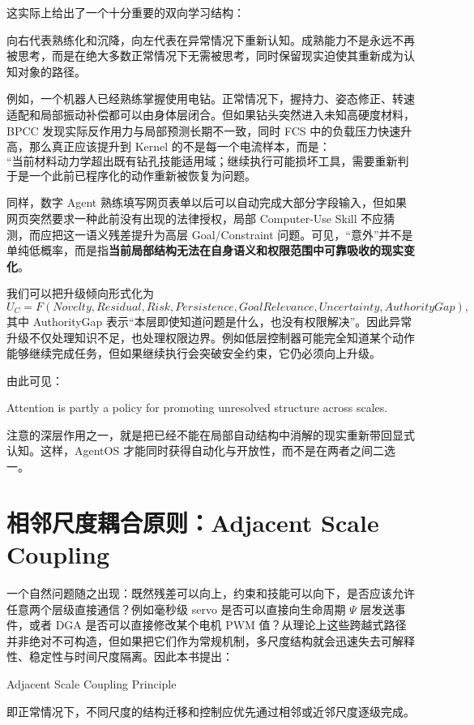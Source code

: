 这实际上给出了一个十分重要的双向学习结构：
\begin{statementbox}
\centering
{}
\end{statementbox}
向右代表熟练化和沉降，向左代表在异常情况下重新认知。成熟能力不是永远不再被思考，而是在绝大多数正常情况下无需被思考，同时保留现实迫使其重新成为认知对象的路径。

例如，一个机器人已经熟练掌握使用电钻。正常情况下，握持力、姿态修正、转速适配和局部振动补偿都可以由身体层闭合。但如果钻头突然进入未知高硬度材料，BPCC 发现实际反作用力与局部预测长期不一致，同时 FCS 中的负载压力快速升高，那么真正应该提升到 Kernel 的不是每一个电流样本，而是：
\[
\text{``当前材料动力学超出既有钻孔技能适用域；继续执行可能损坏工具，需要重新判断材料和策略。''}
\]
于是一个此前已程序化的动作重新被恢复为问题。

同样，数字 Agent 熟练填写网页表单以后可以自动完成大部分字段输入，但如果网页突然要求一种此前没有出现的法律授权，局部 Computer-Use Skill 不应猜测，而应把这一语义残差提升为高层 Goal/Constraint 问题。可见，``意外''并不是单纯低概率，而是指\textbf{当前局部结构无法在自身语义和权限范围中可靠吸收的现实变化}。

我们可以把升级倾向形式化为
\begin{equation}
U_C
=
F
\left(
Novelty,
Residual,
Risk,
Persistence,
GoalRelevance,
Uncertainty,
AuthorityGap
\right),
\end{equation}
其中 AuthorityGap 表示``本层即使知道问题是什么，也没有权限解决''。因此异常升级不仅处理知识不足，也处理权限边界。例如低层控制器可能完全知道某个动作能够继续完成任务，但如果继续执行会突破安全约束，它仍必须向上升级。

由此可见：
\begin{statementbox}
Attention is partly a policy for promoting unresolved structure across scales.
\end{statementbox}
注意的深层作用之一，就是把已经不能在局部自动结构中消解的现实重新带回显式认知。这样，AgentOS 才能同时获得自动化与开放性，而不是在两者之间二选一。

\section{相邻尺度耦合原则：Adjacent Scale Coupling}

一个自然问题随之出现：既然残差可以向上，约束和技能可以向下，是否应该允许任意两个层级直接通信？例如毫秒级 servo 是否可以直接向生命周期 $\Psi$ 层发送事件，或者 DGA 是否可以直接修改某个电机 PWM 值？从理论上这些跨越式路径并非绝对不可构造，但如果把它们作为常规机制，多尺度结构就会迅速失去可解释性、稳定性与时间尺度隔离。因此本书提出：
\begin{statementbox}
Adjacent Scale Coupling Principle
\end{statementbox}
即正常情况下，不同尺度的结构迁移和控制应优先通过相邻或近邻尺度逐级完成。


